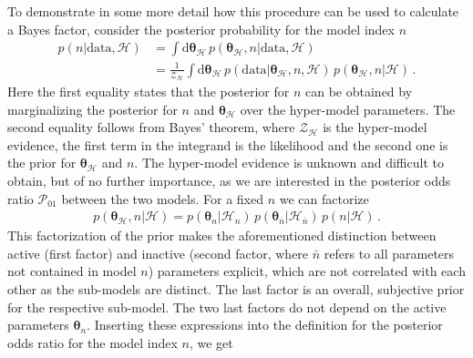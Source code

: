 	To demonstrate in some more detail how this procedure can be used to calculate a Bayes factor, consider the posterior probability for the model index $n$
	\begin{align}
		p(n| \text{data}, \mathcal{H}) &= \int \text{d}\bm{\theta}_\mathcal{H} \, p(\bm{\theta}_\mathcal{H}, n  | \text{data}, \mathcal{H}) \nonumber \\ &= \frac{1}{\mathcal{Z}_\mathcal{H}} \int \text{d}\bm{\theta}_\mathcal{H} \, p(\text{data} | \bm{\theta}_\mathcal{H}, n, \mathcal{H}) \, p(\bm{\theta}_\mathcal{H}, n | \mathcal{H}) \, . \label{eq:BF_prob_n}
	\end{align}
	Here the first equality states that the posterior for $n$ can be obtained by marginalizing the posterior for $n$ and $\bm{\theta}_\mathcal{H}$ over the hyper-model parameters. The second equality follows from Bayes' theorem, where $\mathcal{Z}_\mathcal{H}$ is the hyper-model evidence, the first term in the integrand is the likelihood and the second one is the prior for $\bm{\theta}_\mathcal{H}$ and $n$. The hyper-model evidence is unknown and difficult to obtain, but of no further importance, as we are interested in the posterior odds ratio $\mathcal{P}_{01}$ between the two models. For a fixed $n$ we can factorize
	\begin{align}
		p(\bm{\theta}_\mathcal{H}, n | \mathcal{H}) = p(\bm{\theta}_n| \mathcal{H}_n) \, p(\bm{\theta}_{\overline{n}} | \mathcal{H}_{\overline{n}}) \, p(n | \mathcal{H}) \, . \label{eq:BF_prior}
	\end{align}
	This factorization of the prior makes the aforementioned distinction between active (first factor) and inactive (second factor, where $\bar{n}$ refers to all parameters not contained in model $n$) parameters explicit, which are not correlated with each other as  the sub-models are distinct. The last factor is an overall, subjective prior for the respective sub-model. The two last factors do not depend on the active parameters $\bm{\theta}_n$. Inserting these expressions into the definition for the posterior odds ratio for the model index $n$, we get 
